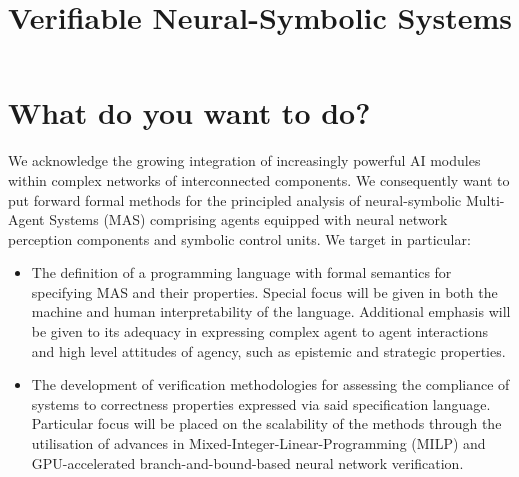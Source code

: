 \documentclass[11pt]{article}
\title{Verifiable Neural-Symbolic Systems}
\date{}
\begin{document}
\maketitle
\section{What do you want to do?}



We acknowledge the growing integration of increasingly powerful AI modules
within complex networks of interconnected components. We consequently want to
put forward formal methods for the principled analysis of neural-symbolic
Multi-Agent Systems (MAS) comprising agents equipped with neural network
perception components and symbolic control units. We target in particular:
\begin{itemize}
    \item  The definition of a programming language with formal semantics for specifying MAS and
their properties. Special focus will be given in both the machine and human
interpretability of the language.  Additional emphasis will be given to  its
adequacy in expressing complex agent to agent interactions and high level
attitudes of agency, such as epistemic and strategic properties.
    \item The development of  verification methodologies for assessing the
compliance of systems  to correctness properties expressed via said
specification language. Particular focus will be placed on the scalability of
the methods through the utilisation of advances in
Mixed-Integer-Linear-Programming (MILP) and GPU-accelerated
branch-and-bound-based neural network verification.
\end{itemize}



\end{document}
